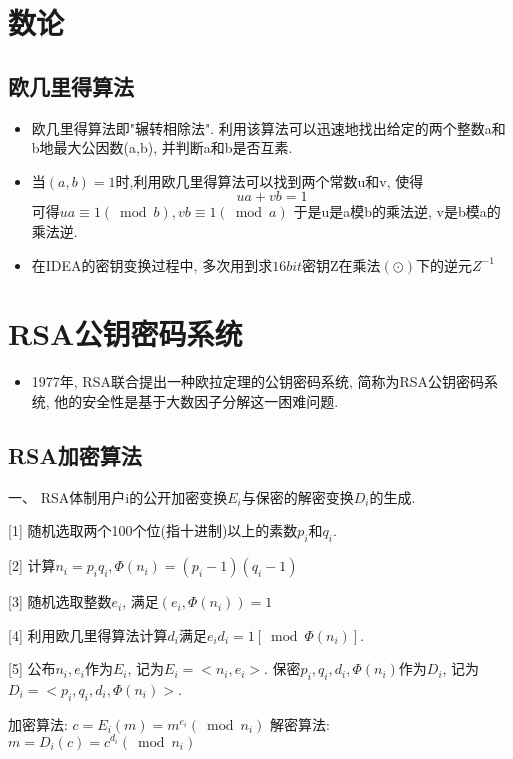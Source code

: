 \documentclass[UTF8]{ctexart}
\begin{document}
    \section{数论}
    \subsection{欧几里得算法}
    \begin{itemize}
        \renewcommand{\labelitemi}{\scriptsize$\blacksquare$}
        \item 欧几里得算法即"辗转相除法". 利用该算法可以迅速地找出给定的两个整数a和b地最大公因数(a,b), 并判断a和b是否互素.
        \item 当$(a,b)=1$时,利用欧几里得算法可以找到两个常数u和v, 使得
        $$ua+vb=1$$
        可得$ua\equiv 1(\bmod b), vb\equiv 1(\bmod a)$
        于是u是a模b的乘法逆, v是b模a的乘法逆.
        \item 在IDEA的密钥变换过程中, 多次用到求$16bit$密钥Z在乘法$(\odot)$下的逆元$Z^{-1}$
    \end{itemize}

    \section{RSA公钥密码系统}
    \begin{itemize}
        \renewcommand{\labelitemi}{\scriptsize$\blacksquare$}
        \item 1977年, RSA联合提出一种欧拉定理的公钥密码系统, 简称为RSA公钥密码系统, 他的安全性是基于大数因子分解这一困难问题.
    \end{itemize}

    \subsection{RSA加密算法}
    一、 RSA体制用户i的公开加密变换$E_i$与保密的解密变换$D_i$的生成.

    [1] 随机选取两个100个位(指十进制)以上的素数$p_i$和$q_i$.

    [2] 计算$n_i=p_iq_i, \Phi(n_i)=(p_i-1)(q_i-1)$

    [3] 随机选取整数$e_i$, 满足$(e_i, \Phi(n_i))=1$

    [4] 利用欧几里得算法计算$d_i$满足$e_id_i=1[\bmod \Phi(n_i)]$.

    [5] 公布$n_i, e_i$作为$E_i$, 记为$E_i=<n_i, e_i>$. 保密$p_i, q_i, d_i, \Phi(n_i)$作为$D_i$, 记为$D_i=<p_i, q_i, d_i, \Phi(n_i)>$.

    加密算法: $c=E_i(m)=m^{e_i}(\bmod n_i)$
    解密算法: $m=D_i(c)=c^{d_i}(\bmod n_i)$
\end{document}

